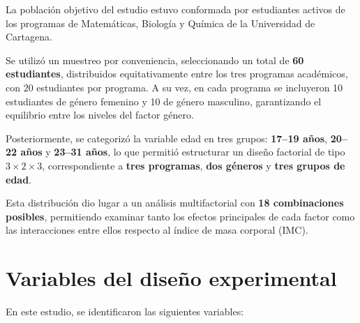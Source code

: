 \documentclass{rapport}
\begin{document}
La población objetivo del estudio estuvo conformada por estudiantes activos de los programas de Matemáticas, Biología y Química de la Universidad de Cartagena.

Se utilizó un muestreo por conveniencia, seleccionando un total de \textbf{60 estudiantes}, distribuidos equitativamente entre los tres programas académicos, con 20 estudiantes por programa. A su vez, en cada programa se incluyeron 10 estudiantes de género femenino y 10 de género masculino, garantizando el equilibrio entre los niveles del factor género.

\vspace{0.5cm}

Posteriormente, se categorizó la variable edad en tres grupos: \textbf{17--19 años}, \textbf{20--22 años} y \textbf{23--31 años}, lo que permitió estructurar un diseño factorial de tipo $3 \times 2 \times 3$, correspondiente a \textbf{tres programas}, \textbf{dos géneros} y \textbf{tres grupos de edad}.

\vspace{0.5cm}

Esta distribución dio lugar a un análisis multifactorial con \textbf{18 combinaciones posibles}, permitiendo examinar tanto los efectos principales de cada factor como las interacciones entre ellos respecto al índice de masa corporal (IMC).


\section{Variables del diseño experimental}

En este estudio, se identificaron las siguientes variables:
\end{document}
